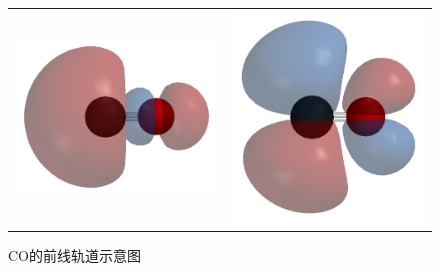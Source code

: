 \documentclass[a4paper,zihao=5,UTF8]{ctexart}
\begin{document}
	\begin{figure}[htbp]
		\centering 
		\begin{tabular}{cc}
		\includegraphics[scale=0.1]{Carbon-monoxide-HOMO-phase-3D-balls.png}
		&
		\includegraphics[scale=0.1]{Carbon-monoxide-LUMO-phase-3D-balls.png}
		\end{tabular}
		\caption{CO的前线轨道示意图}
		\label{CO_HOMO_LUMO}
	\end{figure}
\end{document}
